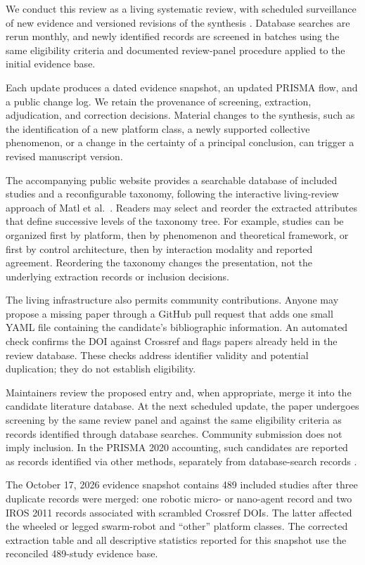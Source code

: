 We conduct this review as a living systematic review,
with scheduled surveillance of new evidence and
versioned revisions of the synthesis
\cite{Elliott2014living,Elliott2017living}.
Database searches are rerun monthly, and newly identified
records are screened in batches using the same eligibility
criteria and documented review-panel procedure applied
to the initial evidence base.

Each update produces a dated evidence snapshot, an
updated PRISMA flow, and a public change log.
We retain the provenance of screening, extraction,
adjudication, and correction decisions. Material changes
to the synthesis, such as the identification of a new
platform class, a newly supported collective phenomenon,
or a change in the certainty of a principal conclusion,
can trigger a revised manuscript version.

The accompanying public website provides a searchable
database of included studies and a reconfigurable
taxonomy, following the interactive living-review
approach of Matl et al.~\cite{Matl2017vascular}.
Readers may select and reorder the extracted attributes
that define successive levels of the taxonomy tree.
For example, studies can be organized first by platform,
then by phenomenon and theoretical framework, or first
by control architecture, then by interaction modality
and reported agreement. Reordering the taxonomy changes
the presentation, not the underlying extraction records
or inclusion decisions.

The living infrastructure also permits community
contributions. Anyone may propose a missing paper
through a GitHub pull request that adds one small
YAML file containing the candidate's bibliographic
information. An automated check confirms the DOI
against Crossref and flags papers already held in
the review database. These checks address identifier
validity and potential duplication; they do not
establish eligibility.

Maintainers review the proposed entry and, when
appropriate, merge it into the candidate literature
database. At the next scheduled update, the paper
undergoes screening by the same review panel and
against the same eligibility criteria as records
identified through database searches. Community
submission does not imply inclusion. In the
PRISMA 2020 accounting, such candidates are
reported as records identified via other methods,
separately from database-search records
\cite{Page2021prisma}.

The October 17, 2026 evidence snapshot contains
489 included studies after three duplicate records
were merged: one robotic micro- or nano-agent record
and two IROS 2011 records associated with scrambled
Crossref DOIs. The latter affected the wheeled or
legged swarm-robot and ``other'' platform classes.
The corrected extraction table and all descriptive
statistics reported for this snapshot use
the reconciled 489-study evidence base.

